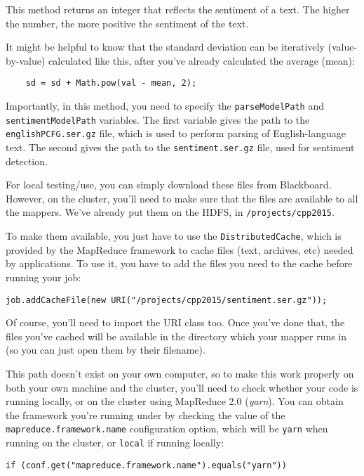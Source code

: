 \documentclass[a4paper,10pt]{article}
\begin{document}
  This method returns an integer that reflects the sentiment of a text. The higher the number, the more positive the sentiment of the text.
 
  It might be helpful to know that the standard deviation can be iteratively (value-by-value) calculated like this, after you've already
  calculated the average (mean): 
  \begin{lstlisting}
    sd = sd + Math.pow(val - mean, 2);
  \end{lstlisting}
   
  Importantly, in this method, you need to specify the \texttt{parseModelPath} and \texttt{sentimentModelPath} variables. The first variable
  gives the path to the \texttt{englishPCFG.ser.gz} file, which is used to perform parsing of English-language text. The second gives the
  path to the \texttt{sentiment.ser.gz} file, used for sentiment detection.

  For local testing/use, you can simply download these files from Blackboard. However, on the cluster, you'll need to make sure that the files
  are available to all the mappers. We've already put them on the HDFS, in \texttt{/projects/cpp2015}.

  To make them available, you just have to use the \texttt{DistributedCache}, which is provided by the MapReduce framework to cache files (text, archives, etc) needed by applications. To use it, you have to add the files you need to the cache before running your job:

\begin{lstlisting}
job.addCacheFile(new URI("/projects/cpp2015/sentiment.ser.gz"));
\end{lstlisting}

  Of course, you'll need to import the URI class too. Once you've done that, the files you've cached will be available in the directory which your mapper runs in (so you can just open them
  by their filename).
  
  This path doesn't exist on your own computer, so to make this work properly on both your own machine and the cluster, you'll
  need to check whether your code is running locally, or on the cluster using MapReduce 2.0 (\emph{yarn}). You can obtain the framework you're running under
  by checking the value of the \texttt{mapreduce.framework.name} configuration option, which will be \texttt{yarn} when running on the cluster, or
  \texttt{local} if running locally:
\begin{lstlisting}
if (conf.get("mapreduce.framework.name").equals("yarn"))
\end{lstlisting}
\end{document}
